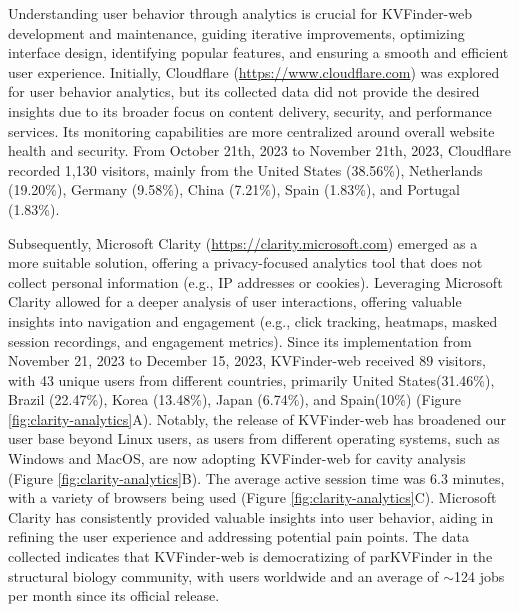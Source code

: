 \documentclass[Ingles]{phdthesis}
\def\eg{e.g.\onedot}
\begin{document}
Understanding user behavior through analytics is crucial for KVFinder-web development and maintenance, guiding iterative improvements, optimizing interface design, identifying popular features, and ensuring a smooth and efficient user experience. Initially, Cloudflare (\url{https://www.cloudflare.com}) was explored for user behavior analytics, but its collected data did not provide the desired insights due to its broader focus on content delivery, security, and performance services. Its monitoring capabilities are more centralized around overall website health and security. From October 21th, 2023 to November 21th, 2023, Cloudflare recorded 1,130 visitors, mainly from the United States (38.56\%), Netherlands (19.20\%), Germany (9.58\%), China (7.21\%), Spain (1.83\%), and Portugal (1.83\%). 

Subsequently, Microsoft Clarity (\url{https://clarity.microsoft.com}) emerged as a more suitable solution, offering a privacy-focused analytics tool that does not collect personal information (\eg, IP addresses or cookies). Leveraging Microsoft Clarity allowed for a deeper analysis of user interactions, offering valuable insights into navigation and engagement (\eg, click tracking, heatmaps, masked session recordings, and engagement metrics). Since its implementation from November 21, 2023 to December 15, 2023, KVFinder-web received 89 visitors, with 43 unique users from different countries, primarily United States(31.46\%), Brazil (22.47\%), Korea (13.48\%), Japan (6.74\%), and Spain(10\%) (Figure \ref{fig:clarity-analytics}A). Notably, the release of KVFinder-web has broadened our user base beyond Linux users, as users from different operating systems, such as Windows and MacOS, are now adopting KVFinder-web for cavity analysis (Figure \ref{fig:clarity-analytics}B). The average active session time was 6.3 minutes, with a variety of browsers being used (Figure \ref{fig:clarity-analytics}C). Microsoft Clarity has consistently provided valuable insights into user behavior, aiding in refining the user experience and addressing potential pain points. The data collected indicates that KVFinder-web is democratizing of parKVFinder in the structural biology community, with users worldwide and an average of $\sim$124 jobs per month since its official release.
\end{document}
